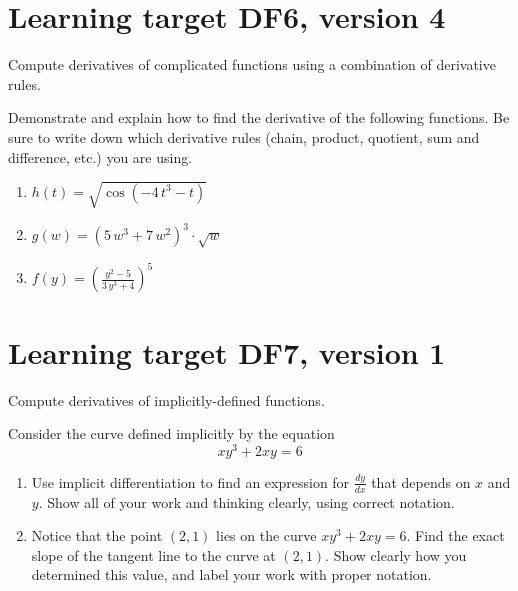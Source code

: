 \pagebreak

\section{Learning target DF6, version 4}

Compute derivatives of complicated functions using a combination of derivative rules.

\hrulefill

Demonstrate and explain how to find the derivative of the following functions. Be sure to write down which derivative rules (chain, product, quotient, sum and difference, etc.) you are using.

\begin{enumerate}
    \item \(h(t) = \sqrt{\cos\left(-4 \, t^{3} - t\right)}\)
    \vfill
    \item \(g(w) = {\left(5 \, w^{3} + 7 \, w^{2}\right)}^{3} \cdot \sqrt{w}\)
    \vfill
    \item \(f(y) = \left(\frac{y^{2} - 5}{3 \, y^{3} + 4} \right)^{ 5 }\)
    \vfill
\end{enumerate}

\pagebreak

\section{Learning target DF7, version 1}

Compute derivatives of implicitly-defined functions.

\hrulefill

Consider the curve defined implicitly by the equation
	$$xy^3 + 2xy = 6$$
	
	\begin{enumerate}[leftmargin=15pt]
	
		\item Use implicit differentiation to find an expression for $\frac{dy}{dx}$ that depends on $x$ and $y$.  Show all of your work and thinking clearly, using correct notation.

		\vfill
	
		
		\item Notice that the point $(2,1)$ lies on the curve $xy^3 + 2xy = 6$.  Find the exact slope of the tangent line to the curve at $(2,1)$.  Show clearly how you determined this value, and label your work with proper notation.
		
		\vfill
	
	\end{enumerate}

